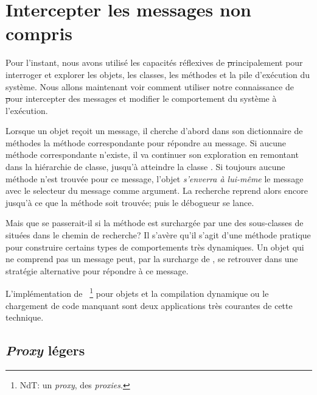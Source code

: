 \documentclass[a4paper,10pt,twoside]{book}
\begin{document}
\section{Intercepter les messages non compris}

Pour l'instant, nous avons utilisé les capacités réflexives de \st principalement pour interroger et explorer les objets, les classes, les méthodes et la pile d'exécution du système. Nous allons maintenant voir comment utiliser notre connaissance de \st pour intercepter des messages et modifier le comportement du système à l'exécution.

Lorsque un objet reçoit un message, il cherche d'abord dans son dictionnaire de méthodes la méthode correspondante pour répondre au message.
Si aucune méthode correspondante n'existe, il va continuer son exploration en remontant dans la hiérarchie de classe, jusqu'à atteindre la classe .
Si toujours aucune méthode n'est trouvée pour ce message, l'objet \emph{s'enverra à lui-même} %
le message  avec le selecteur du message comme argument.
La recherche reprend alors encore jusqu'à ce que la méthode
 soit trouvée; puis le débogueur se lance.

Mais que se passerait-il si la méthode  est surchargée 
par une des sous-classes de  situées dans le chemin de recherche? %
Il s'avère qu'il s'agit d'une méthode pratique pour construire certains types de comportements très dynamiques. Un objet qui ne comprend pas un message peut, par la surcharge de , se retrouver dans une stratégie alternative pour répondre à ce message.

L'implémentation de ~\footnote{NdT: un \emph{proxy}, des \emph{proxies}.} pour objets et la compilation dynamique ou le chargement de code manquant sont deux applications très courantes de cette technique.

\subsection{\emph{Proxy} légers}
\end{document}
